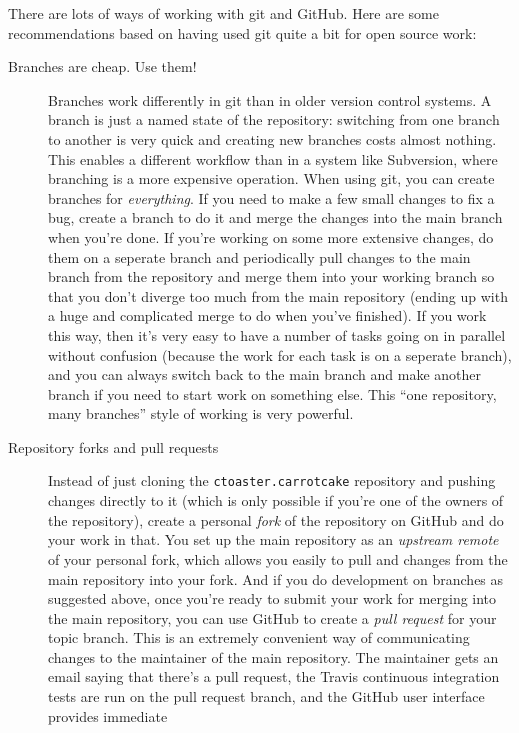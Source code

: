 \documentclass[a4paper,10pt,article]{memoir}
\begin{document}
There are lots of ways of working with git and GitHub.  Here are some
recommendations based on having used git quite a bit for open source
work:
\begin{description}
  \item[Branches are cheap.  Use them!]{Branches work differently in
    git than in older version control systems.  A branch is just a
    named state of the repository: switching from one branch to
    another is very quick and creating new branches costs almost
    nothing.  This enables a different workflow than in a system like
    Subversion, where branching is a more expensive operation.  When
    using git, you can create branches for \emph{everything}.  If you
    need to make a few small changes to fix a bug, create a branch to
    do it and merge the changes into the main branch when you're done.
    If you're working on some more extensive changes, do them on a
    seperate branch and periodically pull changes to the main branch
    from the repository and merge them into your working branch so
    that you don't diverge too much from the main repository (ending
    up with a huge and complicated merge to do when you've finished).
    If you work this way, then it's very easy to have a number of
    tasks going on in parallel without confusion (because the work for
    each task is on a seperate branch), and you can always switch back
    to the main branch and make another branch if you need to start
    work on something else.  This ``one repository, many branches''
    style of working is very powerful.}
  \item[Repository forks and pull requests]{Instead of just cloning
    the \texttt{ctoaster.carrotcake} repository and pushing changes directly to it
    (which is only possible if you're one of the owners of the
    repository), create a personal \emph{fork} of the repository on
    GitHub and do your work in that.  You set up the main repository
    as an \emph{upstream remote} of your personal fork, which allows
    you easily to pull and changes from the main repository into your
    fork.  And if you do development on branches as suggested above,
    once you're ready to submit your work for merging into the main
    repository, you can use GitHub to create a \emph{pull request} for
    your topic branch.  This is an extremely convenient way of
    communicating changes to the maintainer of the main repository.
    The maintainer gets an email saying that there's a pull request,
    the Travis continuous integration tests are run on the pull
    request branch, and the GitHub user interface provides immediate
}
\end{description}
\end{document}
